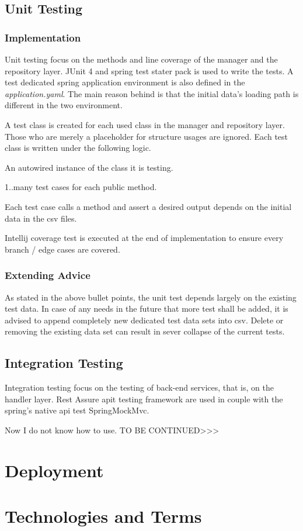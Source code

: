 \subsection{Unit Testing}

\subsubsection{Implementation}
Unit testing focus on the methods and line coverage of the manager and the repository layer. JUnit 4 and spring test stater pack is used to write the tests. A test dedicated spring application environment is also defined in the \textit{application.yaml}. The main reason behind is that the initial data's loading path is different in the two environment.

\bigskip
A test class is created for each used class in the manager and repository layer. Those who are merely a placeholder for structure usages are ignored. Each test class is written under the following logic.

\begin{compactenum}
	\item An autowired instance of the class it is testing.
    \item 1..many test cases for each public method.
    \item Each test case calls a method and assert a desired output depends on the initial data in the csv files.
    \item Intellij coverage test is executed at the end of implementation to ensure every branch / edge cases are covered.
\end{compactenum}

\subsubsection{Extending Advice}
As stated in the above bullet points, the unit test depends largely on the existing test data. In case of any needs in the future that more test shall be added, it is advised to append completely new dedicated test data sets into csv. Delete or removing the existing data set can result in sever collapse of the current tests.

\subsection{Integration Testing}
Integration testing focus on the testing of back-end services, that is, on the handler layer. Rest Assure apit testing framework are used in couple with the spring's native api test SpringMockMvc.

Now I do not know how to use. TO BE CONTINUED>>>

\section{Deployment}

\section{Technologies and Terms}
